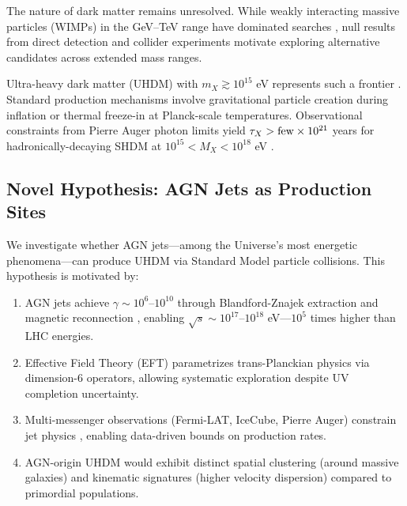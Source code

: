 \documentclass[twocolumn,superscriptaddress,prd,nofootinbib]{revtex4-2}
\begin{document}
The nature of dark matter remains unresolved. While weakly interacting massive particles (WIMPs) in the GeV--TeV range have dominated searches \citep{Jungman1996,Bertone2005}, null results from direct detection \citep{LZ2024} and collider experiments \citep{ATLAS2023} motivate exploring alternative candidates across extended mass ranges.

Ultra-heavy dark matter (UHDM) with $m_X \gtrsim 10^{15}$ eV represents such a frontier \citep{Chung1998a,Kolb2017}. Standard production mechanisms involve gravitational particle creation during inflation \citep{Chung1998a} or thermal freeze-in at Planck-scale temperatures. Observational constraints from Pierre Auger photon limits yield $\tau_X > {\rm few} \times 10^{21}$ years for hadronically-decaying SHDM at $10^{15} < M_X < 10^{18}$ eV \citep{Auger2019PRD}.

\subsection{Novel Hypothesis: AGN Jets as Production Sites}

We investigate whether AGN jets---among the Universe's most energetic phenomena---can produce UHDM via Standard Model particle collisions. This hypothesis is motivated by:

\begin{enumerate}
\item AGN jets achieve $\gamma \sim 10^6$--$10^{10}$ through Blandford-Znajek extraction \citep{BlandfordZnajek1977} and magnetic reconnection \citep{Tchekhovskoy2011}, enabling $\sqrt{s} \sim 10^{17}$--$10^{18}$ eV---$10^5$ times higher than LHC energies.

\item Effective Field Theory (EFT) \citep{Grzadkowski2010} parametrizes trans-Planckian physics via dimension-6 operators, allowing systematic exploration despite UV completion uncertainty.

\item Multi-messenger observations (Fermi-LAT, IceCube, Pierre Auger) constrain jet physics \citep{Ajello2017,IceCube2024,Auger2020}, enabling data-driven bounds on production rates.

\item AGN-origin UHDM would exhibit distinct spatial clustering (around massive galaxies) and kinematic signatures (higher velocity dispersion) compared to primordial populations.
\end{enumerate}
\end{document}
